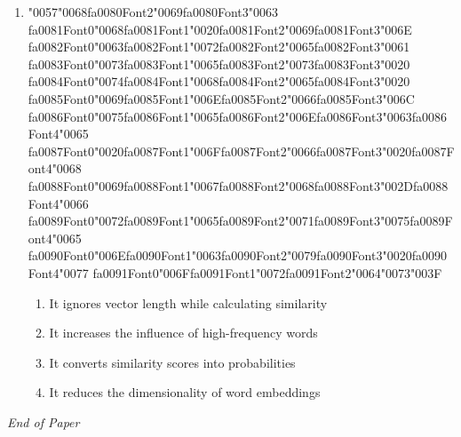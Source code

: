 \documentclass[12pt]{article}
\begin{document}
\begin{enumerate}[label=Q\arabic*.]
\item {\char"0057}{\char"0068}{\csname fa0080Font2\endcsname\char"0069}{\csname fa0080Font3\endcsname\char"0063} {\csname fa0081Font0\endcsname\char"0068}{\csname fa0081Font1\endcsname\char"0020}{\csname fa0081Font2\endcsname\char"0069}{\csname fa0081Font3\endcsname\char"006E} {\csname fa0082Font0\endcsname\char"0063}{\csname fa0082Font1\endcsname\char"0072}{\csname fa0082Font2\endcsname\char"0065}{\csname fa0082Font3\endcsname\char"0061} {\csname fa0083Font0\endcsname\char"0073}{\csname fa0083Font1\endcsname\char"0065}{\csname fa0083Font2\endcsname\char"0073}{\csname fa0083Font3\endcsname\char"0020} {\csname fa0084Font0\endcsname\char"0074}{\csname fa0084Font1\endcsname\char"0068}{\csname fa0084Font2\endcsname\char"0065}{\csname fa0084Font3\endcsname\char"0020} {\csname fa0085Font0\endcsname\char"0069}{\csname fa0085Font1\endcsname\char"006E}{\csname fa0085Font2\endcsname\char"0066}{\csname fa0085Font3\endcsname\char"006C} {\csname fa0086Font0\endcsname\char"0075}{\csname fa0086Font1\endcsname\char"0065}{\csname fa0086Font2\endcsname\char"006E}{\csname fa0086Font3\endcsname\char"0063}{\csname fa0086Font4\endcsname\char"0065} {\csname fa0087Font0\endcsname\char"0020}{\csname fa0087Font1\endcsname\char"006F}{\csname fa0087Font2\endcsname\char"0066}{\csname fa0087Font3\endcsname\char"0020}{\csname fa0087Font4\endcsname\char"0068} {\csname fa0088Font0\endcsname\char"0069}{\csname fa0088Font1\endcsname\char"0067}{\csname fa0088Font2\endcsname\char"0068}{\csname fa0088Font3\endcsname\char"002D}{\csname fa0088Font4\endcsname\char"0066} {\csname fa0089Font0\endcsname\char"0072}{\csname fa0089Font1\endcsname\char"0065}{\csname fa0089Font2\endcsname\char"0071}{\csname fa0089Font3\endcsname\char"0075}{\csname fa0089Font4\endcsname\char"0065} {\csname fa0090Font0\endcsname\char"006E}{\csname fa0090Font1\endcsname\char"0063}{\csname fa0090Font2\endcsname\char"0079}{\csname fa0090Font3\endcsname\char"0020}{\csname fa0090Font4\endcsname\char"0077} {\csname fa0091Font0\endcsname\char"006F}{\csname fa0091Font1\endcsname\char"0072}{\csname fa0091Font2\endcsname\char"0064}{\char"0073}{\char"003F}
\begin{enumerate}[label=(\Alph*)]
    \item It ignores vector length while calculating similarity
    \item It increases the influence of high-frequency words
    \item It converts similarity scores into probabilities
    \item It reduces the dimensionality of word embeddings
\end{enumerate}
\end{enumerate}

\vfill
\noindent\textit{End of Paper}
\end{document}
